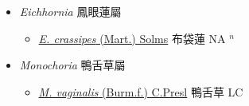 
  \begin{itemize}
 \item[] \textit{Eichhornia} 鳳眼蓮屬
                    
  \begin{itemize}
        \item[] \href{http://www.theplantlist.org/tpl1.1/search?q=Eichhornia+crassipes}{\textit{E. crassipes} (Mart.) Solms}   布袋蓮 NA $^n$
  \end{itemize}
 \item[] \textit{Monochoria} 鴨舌草屬
                    
  \begin{itemize}
        \item[] \href{http://www.theplantlist.org/tpl1.1/search?q=Monochoria+vaginalis}{\textit{M. vaginalis} (Burm.f.) C.Presl}   鴨舌草 LC
  \end{itemize}
  \end{itemize}
